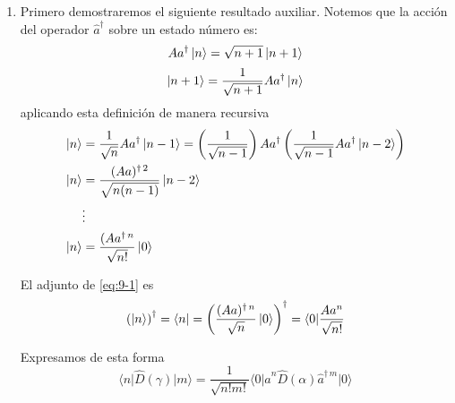 \begin{enumerate}
  \item Primero demostraremos el siguiente resultado auxiliar. Notemos que la acción del operador $\hat{a}^{\dagger}$ sobre un estado número es:
        \begin{equation*}
          A{a}^{\dagger}\ket{n} = \sqrt{n+1}\ket{n+1}
        \end{equation*}
        \begin{equation*}
          \ket{n+1} = \frac{1}{\sqrt{n+1}}A{a}^{\dagger}\ket{n}
        \end{equation*}
        aplicando esta definición de manera recursiva
        \begin{align}
          \ket{n} & = \frac{1}{\sqrt{n}}A{a}^{\dagger}\ket{n-1} = \left( \frac{1}{\sqrt{n-1}} \right)A{a}^{\dagger}\left( \frac{1}{\sqrt{n-1}} A{a}^{\dagger} \ket{n-2} \right) \nonumber \\
          \ket{n} & = \frac{(A{a})^{\dagger\,2}}{\sqrt{n(n-1)}}\ket{n-2} \nonumber                                                                                                              \\
                  & \vdots \nonumber                                                                                                                                                               \\
          \ket{n} & = \frac{(A{a}^{\dagger\,n}}{\sqrt{n!}}\ket{0} \label{eq:9-1}
        \end{align}

        El adjunto de \ref{eq:9-1} es
        \begin{equation}
          \left( \ket{n} \right)^{\dagger} = \langle n | = \left( \frac{(A{a})^{\dagger\,n}}{\sqrt{n}}\ket{0} \right)^\dagger = \langle 0 | \frac{A{a}^n}{\sqrt{n!}}\label{eq:9-2}
        \end{equation}

        Expresamos de esta forma
        \begin{equation}
          \langle n \vert \hat{D}(\gamma) \vert m \rangle = \frac{1}{\sqrt{n!m!}} \langle 0 \vert  \hat{a}^{n} \hat{D}(\alpha)\hat{a}^{\dagger\,m}\vert 0 \rangle \label{eq:9-4}
        \end{equation}


\end{enumerate}
